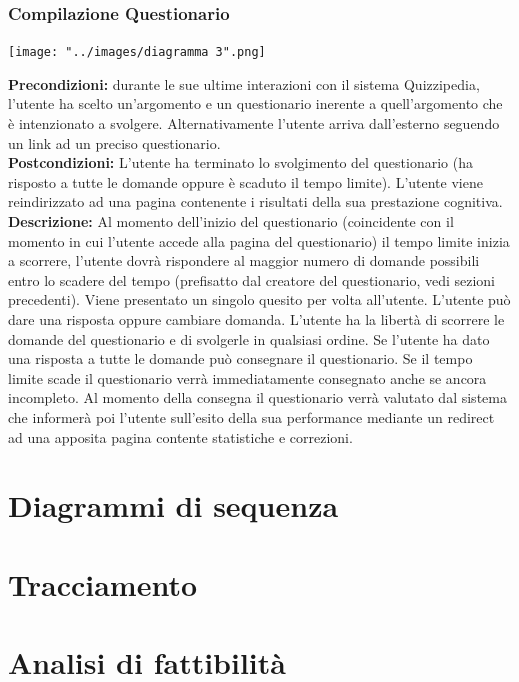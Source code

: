 \documentclass[a4paper,11pt]{article}
\begin{document}
\subsubsection{Compilazione Questionario}
\begin{center}
	\texttt{[image: "../images/diagramma 3".png]}
\end{center}
\textbf{Precondizioni:} durante le sue ultime interazioni con il sistema Quizzipedia, l'utente ha scelto un'argomento e un questionario inerente a quell'argomento che è intenzionato a svolgere. Alternativamente l'utente arriva dall'esterno seguendo un link ad un preciso questionario.\\
\textbf{Postcondizioni:} L'utente ha terminato lo svolgimento del questionario (ha risposto a tutte le domande oppure è scaduto il tempo limite). L'utente viene reindirizzato ad una pagina contenente i risultati della sua prestazione cognitiva.\\
\textbf{Descrizione:} Al momento dell'inizio del questionario (coincidente con il momento in cui l'utente accede alla pagina del questionario) il tempo limite inizia a scorrere, l'utente dovrà rispondere al maggior numero di domande possibili entro lo scadere del tempo (prefisatto dal creatore del questionario, vedi sezioni precedenti). Viene presentato un singolo quesito per volta all'utente. L'utente può dare una risposta oppure cambiare domanda. L'utente ha la libertà di scorrere le domande del questionario e di svolgerle in qualsiasi ordine. Se l'utente ha dato una risposta a tutte le domande può consegnare il questionario. Se il tempo limite scade il questionario verrà immediatamente consegnato anche se ancora incompleto. Al momento della consegna il questionario verrà valutato dal sistema che informerà poi l'utente sull'esito della sua performance mediante un redirect ad una apposita pagina contente statistiche e correzioni.\\
\newpage
	\section{Diagrammi di sequenza}
	\newpage
	\section{Tracciamento}
	\newpage
	\section{Analisi di fattibilità}
\end{document}

